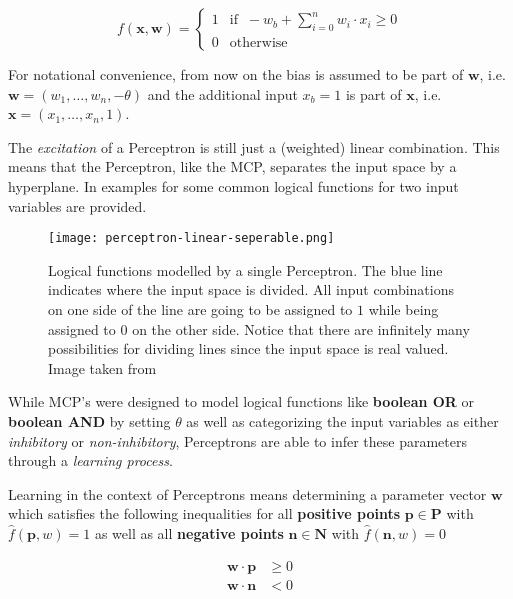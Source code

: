 \begin{equation}
    \label{eq:full-perceptron}
    f(\bm{x}, \bm{w}) =
    \begin{cases}
        1 & \text{if } ~ -w_b + \sum_{i=0}^n w_i \cdot x_i \geq 0 \\
        0 & \text{otherwise}
    \end{cases}
\end{equation}

For notational convenience, from now on the bias is assumed to be part of $\bm{w}$, i.e. $\bm{w} = (w_1, \dots, w_n, -\theta)$ and the additional input $x_b = 1$ is part of $\bm{x}$, i.e. $\bm{x} = (x_1, \dots, x_n, 1)$.

The \textit{excitation} of a Perceptron is still just a (weighted) linear combination.
This means that the Perceptron, like the MCP, separates the input space by a hyperplane.
In  examples for some common logical functions for two input variables are provided.

\begin{figure}[htb!]
    \texttt{[image: perceptron-linear-seperable.png]}
    \caption{Logical functions modelled by a single Perceptron. The blue line indicates where the input space is divided. All input combinations on one side of the line are going to be assigned to $1$ while being assigned to $0$ on the other side. Notice that there are infinitely many possibilities for dividing lines since the input space is real valued. Image taken from \cite{rudolph_lecture_2018}}
    \label{fig:perceptron-logic}
\end{figure}

While MCP's were designed to model logical functions like \textbf{boolean OR} or \textbf{boolean AND} by setting $\theta$ as well as categorizing the input variables as either \textit{inhibitory} or \textit{non-inhibitory}, Perceptrons are able to infer these parameters through a \textit{learning process}.

Learning in the context of Perceptrons means determining a parameter vector $\bm{w}$ which satisfies the following inequalities for all \textbf{positive points} $\bm{p} \in \bm{P}$ with $\hat{f}(\bm{p}, w) = 1$ as well as all \textbf{negative points} $\bm{n} \in \bm{N}$ with $\hat{f}(\bm{n}, w) = 0$

\begin{equation}
    \begin{split}
        \bm{w} \cdot \bm{p} &\geq 0 \\
        \bm{w} \cdot \bm{n} &< 0
    \end{split}
\end{equation}

